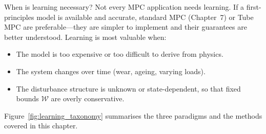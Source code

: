 \begin{alertbox}{When is learning necessary?}
	Not every MPC application needs learning. If a first-principles model is available and accurate, standard MPC (Chapter~7) or Tube MPC are preferable---they are simpler to implement and their guarantees are better understood. Learning is most valuable when:
	\begin{itemize}[noitemsep]
		\item The model is too expensive or too difficult to derive from physics.
		\item The system changes over time (wear, ageing, varying loads).
		\item The disturbance structure is unknown or state-dependent, so that fixed bounds $\mathcal{W}$ are overly conservative.
	\end{itemize}
\end{alertbox}

Figure~\ref{fig:learning_taxonomy} summarises the three paradigms and the methods covered in this chapter.

